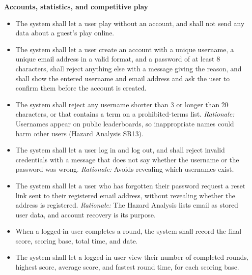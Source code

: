 \documentclass[12pt]{article}
\newcounter{reqnum} %
\begin{document}
\noindent \textbf{Accounts, statistics, and competitive play}
\begin{itemize}
 
\item[FR\refstepcounter{reqnum}\thereqnum \label{FR_GuestPlay}:] The system shall let a user play without an account, and shall not send any data about a guest's play online.
 
\item[FR\refstepcounter{reqnum}\thereqnum \label{FR_CreateAccount}:] The system shall let a user create an account with a unique username, a unique email address in a valid format, and a password of at least 8 characters, shall reject anything else with a message giving the reason, and shall show the entered username and email address and ask the user to confirm them before the account is created.
 
\item[FR\refstepcounter{reqnum}\thereqnum \label{FR_UsernameRules}:] The system shall reject any username shorter than 3 or longer than 20 characters, or that contains a term on a prohibited-terms list. \newline \textit{Rationale:} Usernames appear on public leaderboards, so inappropriate names could harm other users (Hazard Analysis SR13).
 
\item[FR\refstepcounter{reqnum}\thereqnum \label{FR_Login}:] The system shall let a user log in and log out, and shall reject invalid credentials with a message that does not say whether the username or the password was wrong. \newline \textit{Rationale:} Avoids revealing which usernames exist.
 
\item[FR\refstepcounter{reqnum}\thereqnum \label{FR_PasswordReset}:] The system shall let a user who has forgotten their password request a reset link sent to their registered email address, without revealing whether the address is registered. \newline \textit{Rationale:} The Hazard Analysis lists email as stored user data, and account recovery is its purpose.
 
\item[FR\refstepcounter{reqnum}\thereqnum \label{FR_RecordRound}:] When a logged-in user completes a round, the system shall record the final score, scoring base, total time, and date.
 
\item[FR\refstepcounter{reqnum}\thereqnum \label{FR_Statistics}:] The system shall let a logged-in user view their number of completed rounds, highest score, average score, and fastest round time, for each scoring base.
 

\end{itemize}
\end{document}
